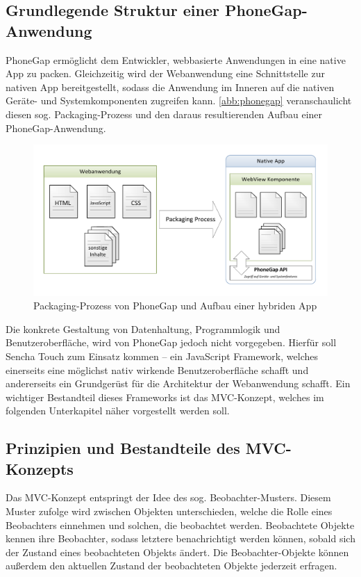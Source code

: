 \subsection{Grundlegende Struktur einer PhoneGap-Anwendung}
PhoneGap ermöglicht dem Entwickler, webbasierte Anwendungen in eine native App zu packen. Gleichzeitig wird der Webanwendung eine Schnittstelle zur nativen App bereitgestellt, sodass die Anwendung im Inneren auf die nativen Geräte- und Systemkomponenten zugreifen kann.
\vref{abb:phonegap} veranschaulicht diesen sog. Packaging-Prozess und den daraus resultierenden Aufbau einer PhoneGap-Anwendung.

\begin{figure}[H]
	\centering
	\includegraphics[width=.9\linewidth]{res/phonegap.pdf}
	\caption{Packaging-Prozess von PhoneGap und Aufbau einer hybriden App\protect\footnotemark}\label{abb:phonegap}
\end{figure}
\protect{}

Die konkrete Gestaltung von Datenhaltung, Programmlogik und Benutzeroberfläche, wird von PhoneGap jedoch nicht vorgegeben. Hierfür soll Sencha Touch zum Einsatz kommen -- ein JavaScript Framework, welches einerseits eine möglichst nativ wirkende Benutzeroberfläche schafft und andererseits ein Grundgerüst für die Architektur der Webanwendung schafft. Ein wichtiger Bestandteil dieses Frameworks ist das MVC-Konzept, welches im folgenden Unterkapitel näher vorgestellt werden soll.

\subsection{Prinzipien und Bestandteile des MVC-Konzepts}
Das MVC-Konzept entspringt der Idee des sog. Beobachter-Musters. Diesem Muster zufolge wird zwischen Objekten unterschieden, welche die Rolle eines Beobachters einnehmen und solchen, die beobachtet werden. Beobachtete Objekte kennen ihre Beobachter, sodass letztere benachrichtigt werden können, sobald sich der Zustand eines beobachteten Objekts ändert. Die Beobachter-Objekte können außerdem den aktuellen Zustand der beobachteten Objekte jederzeit erfragen.

